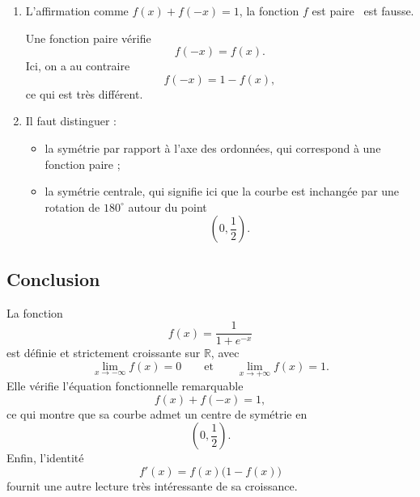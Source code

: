 \documentclass[11pt,a4paper]{article}
\begin{document}
\begin{enumerate}
    \item L'affirmation \og comme \(f(x)+f(-x)=1\), la fonction \(f\) est paire \fg\ est fausse.

    Une fonction paire vérifie
    \[
    f(-x)=f(x).
    \]
    Ici, on a au contraire
    \[
    f(-x)=1-f(x),
    \]
    ce qui est très différent.

    \item Il faut distinguer :
    \begin{itemize}
        \item la symétrie par rapport à l'axe des ordonnées, qui correspond à une fonction paire ;
        \item la symétrie centrale, qui signifie ici que la courbe est inchangée par une rotation de \(180^\circ\) autour du point
        \[
        \left(0,\frac12\right).
        \]
    \end{itemize}
\end{enumerate}

\subsection*{Conclusion}

La fonction
\[
f(x)=\frac{1}{1+e^{-x}}
\]
est définie et strictement croissante sur \(\mathbb{R}\), avec
\[
\lim_{x\to-\infty}f(x)=0
\qquad \text{et} \qquad
\lim_{x\to+\infty}f(x)=1.
\]
Elle vérifie l'équation fonctionnelle remarquable
\[
f(x)+f(-x)=1,
\]
ce qui montre que sa courbe admet un centre de symétrie en
\[
\left(0,\frac12\right).
\]
Enfin, l'identité
\[
f'(x)=f(x)\bigl(1-f(x)\bigr)
\]
fournit une autre lecture très intéressante de sa croissance.
\end{document}
